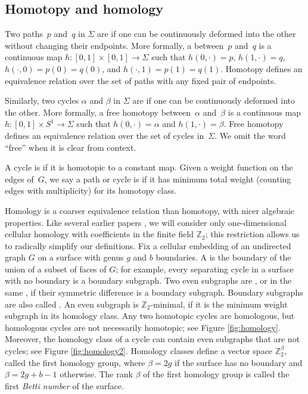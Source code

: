 \documentclass[letterpaper,review]{siamart190516}
\def\Z{\mathbb{Z}}
\def\modified#1{\color{blue}#1 \color{black}}
\begin{document}
\subsection{Homotopy and homology}
\label{SS:homology}

Two paths~$p$ and~$q$ in $\Sigma$ are  if one can be continuously deformed into the other without changing their endpoints.
More formally, a  between~$p$ and~$q$ is a continuous map $h\colon {[0,1]\times [0,1] \to \Sigma}$ such that $h(0,\cdot) = p$, $h(1,\cdot) = q$, $h(\cdot, 0)=p(0)=q(0)$, and $h(\cdot,1)=p(1)=q(1)$.  Homotopy defines an equivalence relation over the set of paths with any fixed pair of endpoints.

Similarly, two cycles $\alpha$ and $\beta$ in $\Sigma$ are  if one can be
continuously deformed into the other.  More formally, a free homotopy between~$\alpha$ and~$\beta$
is a continuous map $h\colon {[0,1]\times S^1 \to \Sigma}$ such that $h(0,\cdot) = \alpha$ and
$h(1,\cdot) = \beta$.  Free homotopy defines an equivalence relation over the set of cycles
in~$\Sigma$.  We omit the word ``free'' when it is clear from context.

%
%
A cycle is  if it is homotopic to a constant map.
Given a weight function on the edges of~$G$, we say a path or cycle is  if it has minimum total weight (counting edges with multiplicity) for its homotopy class.

Homology is a coarser equivalence relation than homotopy, with nicer
algebraic properties.  Like several earlier papers \cite{cf-qhc2-07,
cf-qhc-08, dls-chtl-07, dlsc-cgaht-08,e-sncds-11,f-sntcd-13}, we will consider only
one-dimensional cellular homology with coefficients in the finite
field $\Z_2$; this restriction allows us to radically simplify our
definitions.
Fix a cellular embedding of an undirected graph $G$ on a surface with genus $g$ and $b$ boundaries.  A  is the boundary of the union of a subset of faces of $G$; for example, every separating cycle \modified{in a surface with no boundary} is a boundary subgraph.
Two even subgraphs are , or in the same , if their symmetric difference is a boundary subgraph.
Boundary subgraphs are also called .  \modified{An even subgraph is $\Z_2$-minimal, if it is the minimum weight subgraph in its homology class.} Any two homotopic cycles are homologous, but homologous cycles are not necessarily homotopic; see Figure \ref{fig:homology}.  Moreover, the homology class of a cycle can contain even subgraphs that are not cycles; see Figure \ref{fig:homology2}.
Homology classes define a vector space $\Z_2^\beta$, called the first homology group, where $\beta = 2g$ if the surface has no boundary and $\beta = 2g+b-1$ otherwise.
The rank $\beta$ of the first homology group is called the first \emph{Betti number} of the surface.
\end{document}
